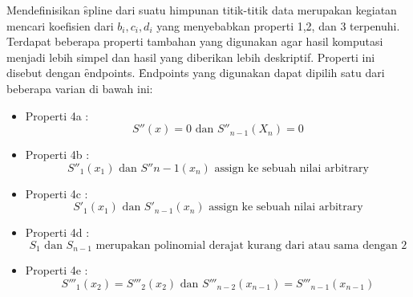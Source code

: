 Mendefinisikan \f{spline} dari suatu himpunan titik-titik data merupakan kegiatan mencari koefisien dari $b_i, c_i, d_i$ yang menyebabkan properti 1,2, dan 3 terpenuhi. Terdapat beberapa properti tambahan yang digunakan agar hasil komputasi menjadi lebih simpel dan hasil yang diberikan lebih deskriptif. Properti ini disebut dengan \f{endpoints}. \f{Endpoints} yang digunakan dapat dipilih satu dari beberapa varian di bawah ini:
\begin{itemize}
	\item Properti 4a  : \[ S''(x) = 0 \text{  dan  } S''_{n-1}(X_n) = 0\]
	\item Properti 4b  : \[ S''_{1}(x_1) \text{  dan  }  S''{n-1}(x_n) \text{ assign ke sebuah nilai arbitrary}\]
	\item Properti 4c  : \[ S'_{1}(x_1) \text{  dan  } S'_{n-1}(x_n) \text{  assign ke sebuah nilai arbitrary}\]
	\item Properti 4d  : \[  S_{1} \text{ dan } S_{n-1} \text{ merupakan polinomial derajat kurang dari atau sama dengan 2}\]
	\item Properti 4e  :\[ S'''_{1}(x_2) = S'''_{2}(x_2) \text{  dan  } S'''_{n-2}(x_{n-1}) = S'''_{n-1}(x_{n-1}) \]
\end{itemize}



